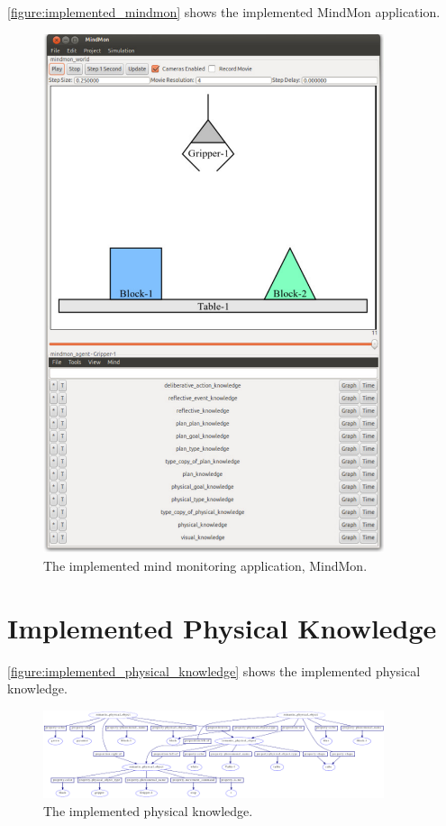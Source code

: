 {\mbox{\autoref{figure:implemented_mindmon}}} shows the implemented
MindMon application.
\begin{figure}
\includegraphics[width=10cm]{gfx/implemented_mindmon}
\caption[The implemented mind monitoring application, MindMon.]{The
  implemented mind monitoring application, MindMon.}
\label{figure:implemented_mindmon}
\end{figure}

\section{Implemented Physical Knowledge}

{\mbox{\autoref{figure:implemented_physical_knowledge}}} shows the
implemented physical knowledge.
\begin{figure}
\includegraphics[width=10cm]{gfx/implemented_physical_knowledge}
\caption[The implemented physical knowledge.]{The implemented physical
  knowledge.}
\label{figure:implemented_physical_knowledge}
\end{figure}

